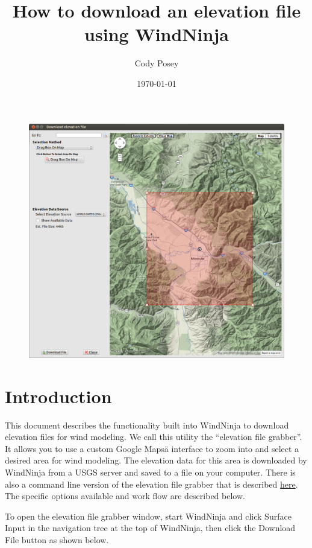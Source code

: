 \documentclass[12pt,oneside,final]{article}
\title{How to download an elevation file using WindNinja}
\author{Cody Posey}
\date{\today}
\begin{document}
\maketitle

\begin{figure}[ht!]
    \centering
    \includegraphics[width=7in]{images/download_dem_0.png}
\end{figure}

\section{Introduction}

This document describes the functionality built into WindNinja to download
elevation files for wind modeling.  We call this utility the “elevation file
grabber”.  It allows you to use a custom Google Mapsä interface to zoom into
and select a desired area for wind modeling. The elevation data for this area
is downloaded by WindNinja from a USGS server and saved to a file on your
computer.  There is also a command line version of the elevation file grabber
that is described \href{run:./fetch_dem_instructions.pdf}{here}.  The specific
options available and work flow are described below.

To open the elevation file grabber window, start WindNinja and click Surface
Input in the navigation tree at the top of WindNinja, then click the Download
File button as shown below.
\end{document}
